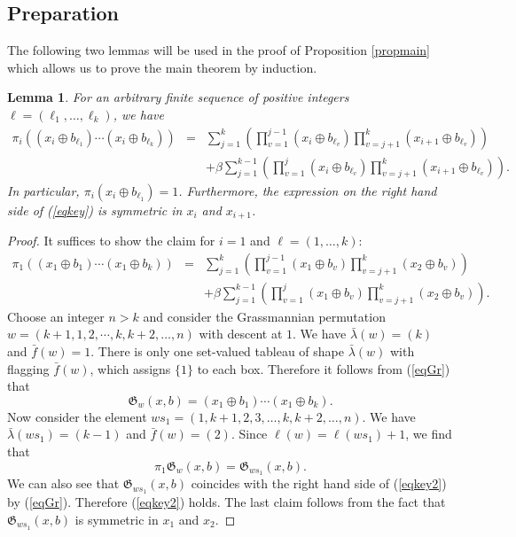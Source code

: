 \documentclass[11pt,reqno,sumlimits]{amsart}
\newcommand{\frakG}{{\mathfrak G}}
\newtheorem{lem}[thm]{Lemma}
\theoremstyle{definition}
\numberwithin{equation}{section}
\begin{document}
\subsection{Preparation}
The following two lemmas will be used in the proof of Proposition \ref{propmain} which allows us to prove the main theorem by induction.
\begin{lem}\label{lemkey}
For an arbitrary finite sequence of positive integers $\ell=(\ell_1,\dots, \ell_k)$,  we have
\begin{eqnarray}
\pi_i\left((x_i \oplus b_{\ell_1}) \cdots (x_i \oplus b_{\ell_k})\right) 
&=& \sum_{j=1}^k \left(\prod_{v=1}^{j-1} (x_i \oplus b_{\ell_v}) \prod_{v=j+1}^k (x_{i+1} \oplus b_{\ell_v})\right)\nonumber\\
&& + \beta \sum_{j=1}^{k-1} \left(\prod_{v=1}^{j} (x_i \oplus b_{\ell_v}) \prod_{v=j+1}^k (x_{i+1} \oplus b_{\ell_v})\right) \label{eqkey}.
\end{eqnarray}
In particular, $\pi_i(x_i \oplus b_{\ell_1})=1$. Furthermore, the expression on the right hand side of (\ref{eqkey}) is symmetric in $x_i$ and $x_{i+1}$.
\end{lem}
\begin{proof}
It suffices to show the claim for $i=1$ and $\ell=(1,\dots,k)$:
\begin{eqnarray}
\pi_1\left((x_1 \oplus b_{1}) \cdots (x_1 \oplus b_{k})\right) 
&=& \sum_{j=1}^k \left(\prod_{v=1}^{j-1} (x_1 \oplus b_{v}) \prod_{v=j+1}^k (x_2 \oplus b_{v})\right)\nonumber\\
&& + \beta \sum_{j=1}^{k-1} \left(\prod_{v=1}^{j} (x_1 \oplus b_{v}) \prod_{v=j+1}^k (x_2 \oplus b_{v})\right)\label{eqkey2}.
\end{eqnarray}
Choose an integer $n>k$ and consider the Grassmannian permutation $w=(k+1,1,2,\cdots, k,k+2,\dots, n)$ with descent at $1$.
We have $\bar\lambda(w) = (k)$ and $\bar f(w)=1$. There is only one set-valued tableau of shape $\bar\lambda(w)$ with flagging $\bar f(w)$, which assigns $\{1\}$ to each box. Therefore it follows from (\ref{eqGr}) that
\[
\frakG_w(x,b) = (x_1 \oplus b_1) \cdots (x_1 \oplus b_k).
\]
Now consider the element $ws_1=(1,k+1,2,3,\dots, k,k+2,\dots,n)$. We have $\bar\lambda(ws_1) = (k-1)$ and $\bar f(w)=(2)$. Since $\ell(w)=\ell(ws_1)+1$, we find that
\[
\pi_1\frakG_w(x,b) = \frakG_{ws_1}(x,b).
\]
We can also see that $\frakG_{ws_1}(x,b)$ coincides with the right hand side of (\ref{eqkey2}) by (\ref{eqGr}). Therefore (\ref{eqkey2}) holds. The last claim follows from the fact that $\frakG_{ws_1}(x,b)$ is symmetric in $x_1$ and $x_2$.
\end{proof}
\end{document}
